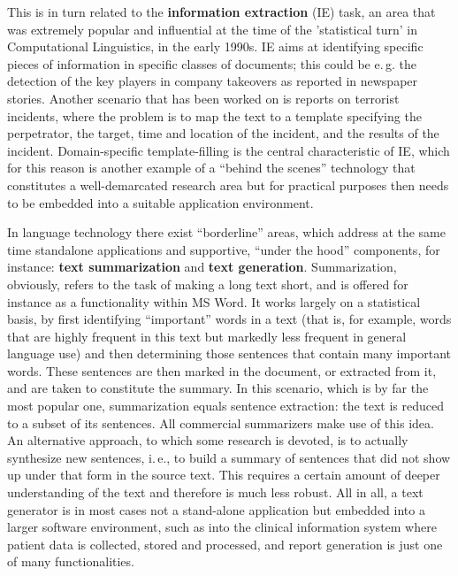 \begin{multicols}{2}
This is in turn related to the {\bf information extraction} (IE) task, an
area that was extremely popular and influential at the time of the
'statistical turn' in Computational Linguistics, in the early
1990s. IE aims at identifying specific pieces of information in
specific classes of documents; this could be e.\,g. the detection of the
key players in company takeovers as reported in newspaper
stories. Another scenario that has been worked on is reports on
terrorist incidents, where the problem is to map the text to a
template specifying the perpetrator, the target, time and location of
the incident, and the results of the incident. Domain-specific
template-filling is the central characteristic of IE, which for this
reason is another example of a ``behind the scenes'' technology that
constitutes a well-demarcated research area but for practical purposes
then needs to be embedded into a suitable application environment.

In language technology there exist ``borderline'' areas, which address at the same time standalone applications and supportive, ``under the hood''
components, for instance: {\bf text summarization} and {\bf text
  generation}. Summarization, obviously, refers to the task of making
a long text short, and is offered for instance as a functionality
within MS Word. It works largely on a statistical basis, by first
identifying ``important'' words in a text (that is, for example, words
that are highly frequent in this text but markedly less frequent in
general language use) and then determining those sentences that
contain many important words. These sentences are then marked in the
document, or extracted from it, and are taken to constitute the
summary. In this scenario, which is by far the most popular one,
summarization equals sentence extraction: the text is reduced to a
subset of its sentences. All commercial summarizers make use of this
idea. An alternative approach, to which some research is devoted, is
to actually synthesize new sentences, i.\,e., to build a summary of
sentences that did not show up under that form in the source text. This
requires a certain amount of deeper understanding of the text and
therefore is much less robust. All in all, a text generator is in most
cases not a stand-alone application but embedded into a larger
software environment, such as into the clinical information system
where patient data is collected, stored and processed, and report
generation is just one of many functionalities.


\end{multicols}
